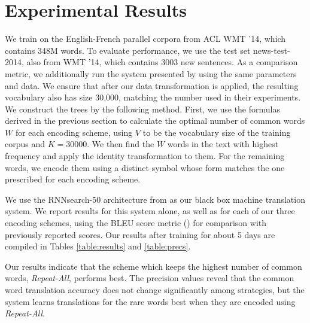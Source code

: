 \section{Experimental Results}
\label{sec:exp}

We train on the English-French parallel corpora from ACL WMT '14, which contains
348M words. To evaluate performance, we use the test set news-test-2014, also from
WMT '14, which contains 3003 new sentences. As a comparison metric, we additionally run the system presented by
 using the same parameters and data. We ensure
that after our data transformation is applied, the resulting vocabulary also has size
30,000, matching the number used in their experiments. We construct the trees by the following method. First, we use
the formulas derived in the previous section to calculate the optimal number of
common words $W$ for each encoding scheme, using $V$ to be the vocabulary size of the training corpus and $K = 30000$.
We then find the $W$ words in the text with highest frequency and
apply the identity transformation to them. For the remaining words, we encode them
using a distinct symbol whose form matches the one prescribed for each
encoding scheme.

We use the RNNsearch-50 architecture from  as
our black box machine translation system. We report results for this system alone,
as well as for each of our three encoding schemes, using the BLEU score metric () for
comparison with previously reported scores. Our results after training
for about 5 days are compiled in Tables \ref{table:results} and \ref{table:precs}.

Our results indicate that the scheme which keeps the highest number of common words, \emph{Repeat-All},
performs best. The precision values reveal that the common word translation accuracy does not change significantly
among strategies, but the system learns translations for the rare words best when they are encoded
using \emph{Repeat-All}.

\begin{table}
  \centering
  \vspace{8pt}
  \caption{BLEU scores on detokenized test set for various encoding
    schemes after training for 5 days.}
  \label{table:results}
\end{table}

